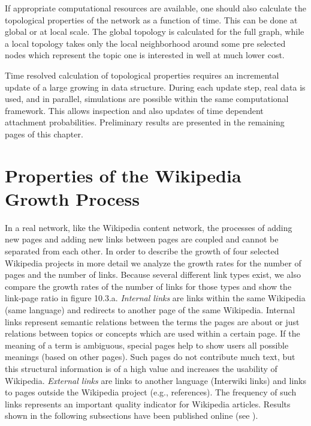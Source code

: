 \documentclass[a4paper,10pt]{scrbook}
\begin{document}
If appropriate computational resources are available, one should also calculate the topological properties of the network as a function of time. This can be done at global or at local scale. The global topology is calculated for the full graph, while a local topology takes only the local neighborhood around some pre selected nodes which represent the topic one is interested in well at much lower cost.

%

Time resolved calculation of topological properties requires an incremental update of a large growing in data structure. During each update step, real data is used, and in parallel, simulations are possible within the same computational framework. This allows inspection and also updates of time dependent attachment probabilities. Preliminary results are presented in the remaining pages of this chapter.
 
\section{Properties of the Wikipedia Growth Process}


In a real network, like the Wikipedia content network, the processes of adding new pages and 
adding new links between pages are coupled and cannot be separated from each other.  In order 
to describe the growth of four selected Wikipedia projects in more detail we analyze the growth 
rates for the number of pages and the number of links. Because several different link types exist, we also compare the growth rates of the number of links for those types and show the link-page ratio in figure 10.3.a. {\it Internal
links} are links within the same Wikipedia (same language) and redirects to another page of
the same Wikipedia.  Internal links represent semantic relations between the terms the pages 
are about or just relations between topics or concepts which are used within a certain page.
If the meaning of a term is ambiguous, special pages help to show users all possible meanings 
(based on other pages).  Such pages do not contribute much text, but this structural information 
is of a high value and increases the usability of Wikipedia.  {\it External links} are links 
to another language (Interwiki links) and links to pages outside the Wikipedia project (e.g., 
references).  The frequency of such links represents an important quality indicator for 
Wikipedia articles. Results shown in the following subsections have been published online (see  \cite{Schreck2013}). 
\end{document}
